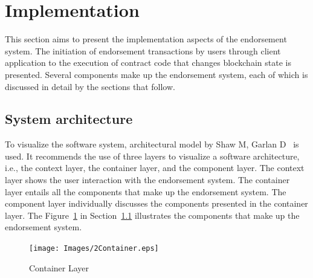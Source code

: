 \section{Implementation}
This section aims to present the implementation aspects of the endorsement
system. The initiation of endorsement transactions by users through client
application to the execution of contract code that changes blockchain state is
presented. Several components make up the endorsement system, each of which is
discussed in detail by the sections that follow. 

\subsection{System architecture} \label{subsec:architecture}
To visualize the software system, architectural model by Shaw M, Garlan
D~\cite{johann2015software} is used. It recommends the use of three layers to
visualize a software architecture, i.e., the context layer, the container
layer, and the component layer. The context layer shows the user interaction
with the endorsement system. The container layer entails all the components
that make up the endorsement system. The component layer individually discusses
the components presented in the container layer. The
Figure~\ref{fig:SystemContainer} in Section~\ref{subsec:architecture}
illustrates the components that make up the endorsement system. 
\begin{figure}
	\texttt{[image: Images/2Container.eps]}
	\caption{Container Layer}
	\label{fig:SystemContainer}
\end{figure}

%
